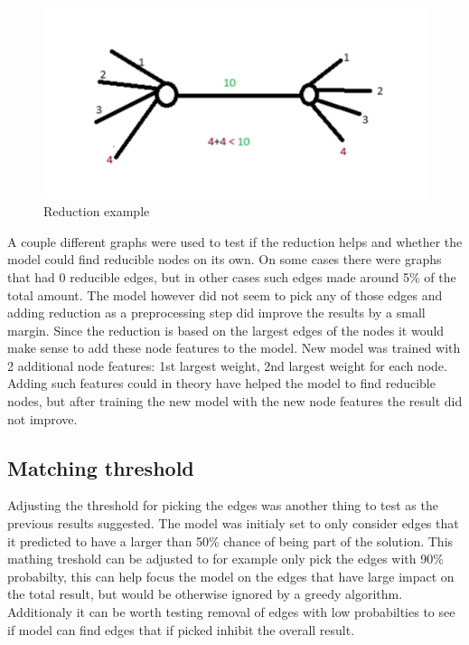 \begin{figure}[H]
    \centering
    \includegraphics[scale=1.0]{figures/ReductionExample}
    \caption{Reduction example}
    \label{Reduction example}
\end{figure}

A couple different graphs were used to test if the reduction helps and whether the model could find reducible nodes on its own. On some cases there were graphs that had 0 reducible edges, but in other cases such edges made around 5\% of the total amount. The model however did not seem to pick any of those edges and adding reduction as a preprocessing step did improve the results by a small margin. Since the reduction is based on the largest edges of the nodes it would make sense to add these node features to the model. 
New model was trained with 2 additional node features: 1st largest weight, 2nd largest weight for each node.
Adding such features could in theory have helped the model to find reducible nodes, but after training the new model with the new node features the result did not improve.

\subsection{Matching threshold}

Adjusting the threshold for picking the edges was another thing to test as the previous results suggested. The model was initialy set to only consider edges that it predicted to have a larger than 50\% chance of being part of the solution. This mathing treshold can be adjusted to for example only pick the edges with 90\% probabilty, this can help focus the model on the edges that have large impact on the total result, but would be otherwise ignored by a greedy algorithm. Additionaly it can be worth testing removal of edges with low probabilties to see if model can find edges that if picked inhibit the overall result.

